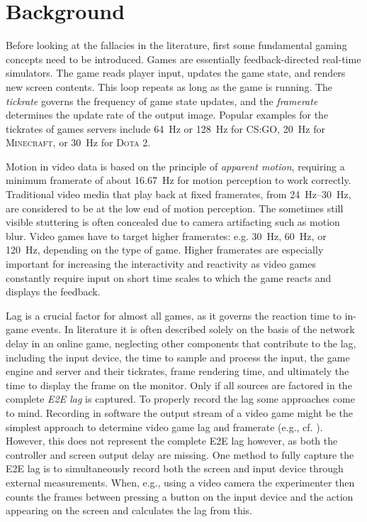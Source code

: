 \section{Background}
\label{sec:background}

Before looking at the fallacies in the literature, first some fundamental gaming concepts need to be introduced. Games are essentially feedback-directed real-time simulators. The game reads player input, updates the game state, and renders new screen contents. This loop repeats as long as the game is running. The \textit{tickrate} governs the frequency of game state updates, and the \textit{framerate} determines the update rate of the output image. Popular examples for the tickrates of games servers include \SI{64}{\hertz} or \SI{128}{\hertz} for \textsc{CS:GO}, \SI{20}{\hertz} for \textsc{Minecraft}, or \SI{30}{\hertz} for \textsc{Dota 2}.

Motion in video data is based on the principle of \textit{apparent motion}, requiring a minimum framerate of about \SI{16.67}{\hertz} for motion perception to work correctly. Traditional video media that play back at fixed framerates, from \SIrange{24}{30}{\hertz}, are considered to be at the low end of motion perception. The sometimes still visible stuttering is often concealed due to camera artifacting such as motion blur. Video games have to target higher framerates: e.g. \SI{30}{\hertz}, \SI{60}{\hertz}, or \SI{120}{\hertz}, depending on the type of game. Higher framerates are especially important for increasing the interactivity and reactivity as video games constantly require input on short time scales to which the game reacts and displays the feedback.

Lag is a crucial factor for almost all games, as it governs the reaction time to in-game events. In literature it is often described solely on the basis of the network delay in an online game, neglecting other components that contribute to the lag, including the input device, the time to sample and process the input, the game engine and server and their tickrates, frame rendering time, and ultimately the time to display the frame on the monitor. Only if all sources are factored in the complete \textit{\gls{E2E} lag} is captured. To properly record the lag some approaches come to mind. Recording in software the output stream of a video game might be the simplest approach to determine video game lag and framerate (e.g., cf. \cite{Chen:2011:MLC:2072298.2071991}). However, this does not represent the complete \gls{E2E} lag however, as both the controller and screen output delay are missing. One method to fully capture the \gls{E2E} lag is to simultaneously record both the screen and input device through external measurements. When, e.g., using a video camera the experimenter then counts the frames between pressing a button on the input device and the action appearing on the screen and calculates the lag from this.

